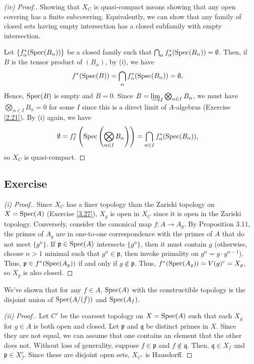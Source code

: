 \begin{proof}[(iv) Proof.]
Showing that $X_C$ is quasi-compact means showing that any open covering has a finite subcovering. Equivalently, we can show that any family of closed sets having empty intersection has
a closed subfamily with empty intersection.

Let $\{f_{\alpha}^*(\operatorname{Spec}(B_{\alpha}))\}$ be a closed family such that $\bigcap_{\alpha}f_{\alpha}^*(\operatorname{Spec}(B_{\alpha})) = \emptyset$. Then, if $B$ is the tensor product of $(B_{\alpha})$,
by (i), we have
$$f^*(\operatorname{Spec}(B)) = \bigcap_{\alpha}f_{\alpha}^*(\operatorname{Spec}(B_{\alpha})) = \emptyset,$$
Hence, $\operatorname{Spec}(B)$ is empty and $B = 0$. Since $B = \varinjlim_{I} \bigotimes_{\alpha \in I}B_{\alpha}$,
we must have $\bigotimes_{\alpha \in I}B_{\alpha} = 0$ for some $I$ since this is a direct limit of $A$-algebras (Exercise \ref{2.21}). By (i) again, we have
$$\emptyset = f_I^*\left(\operatorname{Spec}\left(\bigotimes_{\alpha \in I}B_{\alpha}\right)\right) = \bigcap_{\alpha \in I}f_\alpha^*(\operatorname{Spec}(B_{\alpha})),$$
so $X_C$ is quasi-compact.
\end{proof}

\subsection{Exercise}\label{3.28}

\begin{proof}[(i) Proof.]
Since $X_C$ has a finer topology than the Zariski topology on $X = \operatorname{Spec}(A)$ (Exercise \ref{3.27}), $X_g$ is open in $X_C$ since it is open in the Zariski topology. Conversely, consider the
canonical map $f : A \to A_g$. By Proposition 3.11, the primes of $A_g$ are in one-to-one correspondence with the primes of $A$ that do not meet $\{g^n\}$. If $\mathfrak{p} \in \operatorname{Spec}(A)$ intersects
$\{g^n\}$, then it must contain $g$ (otherwise, choose $n > 1$ minimal such that $g^n \in \mathfrak{p}$, then invoke primality on $g^n = g \cdot g^{n-1}$). Thus, $\mathfrak{p} \in f^*(\operatorname{Spec}(A_g))$ if
and only if $g \not\in \mathfrak{p}$. Thus, $f^*(\operatorname{Spec}(A_g)) = V(g)^c = X_g$, so $X_g$ is also closed.
\end{proof}

\begin{remark}
We've shown that for any $f \in A$, $\operatorname{Spec}(A)$ with the constructible topology is the disjoint union of $\operatorname{Spec}(A/(f))$ and $\operatorname{Spec}(A_f)$.
\end{remark}

\begin{proof}[(ii) Proof.]
Let $C'$ be the coarsest topology on $X = \operatorname{Spec}(A)$ such that each $X_g$ for $g \in A$ is both open and closed. Let $\mathfrak{p}$ and $\mathfrak{q}$ be distinct
primes in $X$. Since they are not equal, we can assume that one contains an element that the other does not. Without loss of generality, suppose $f \in \mathfrak{p}$
and $f \not\in \mathfrak{q}$. Then, $\mathfrak{q} \in X_f$ and $\mathfrak{p} \in X_f^c$. Since these are disjoint open sets, $X_{C'}$ is Hausdorff.
\end{proof}

